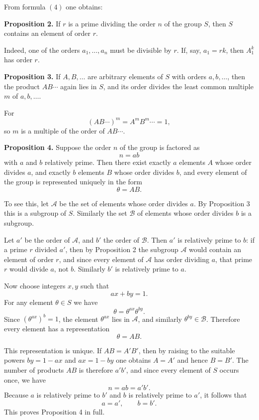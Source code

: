 \documentclass[11pt,a4paper]{book}
\begin{document}
From formula \((4)\) one obtains:

\medskip
\noindent\textbf{Proposition 2.}
If \(r\) is a prime dividing the order \(n\) of the group \(S\), then \(S\) contains an element of order \(r\).

\medskip
Indeed, one of the orders \(a_1,\dots,a_n\) must be divisible by \(r\). If, say, \(a_1=rk\), then \(A_1^k\) has order \(r\).

\medskip
\noindent\textbf{Proposition 3.}
If \(A,B,\dots\) are arbitrary elements of \(S\) with orders \(a,b,\dots\), then the product \(AB\cdots\) again lies in \(S\), and its order divides the least common multiple \(m\) of \(a,b,\dots\).

\medskip
For
\[
(AB\cdots)^m=A^mB^m\cdots=1,
\]
so \(m\) is a multiple of the order of \(AB\cdots\).

\medskip
\noindent\textbf{Proposition 4.}
Suppose the order \(n\) of the group is factored as
\[
n=ab
\]
with \(a\) and \(b\) relatively prime. Then there exist exactly \(a\) elements \(A\) whose order divides \(a\), and exactly \(b\) elements \(B\) whose order divides \(b\), and every element of the group is represented uniquely in the form
\[
\theta=AB.
\tag{5}
\]

To see this, let \(\mathcal A\) be the set of elements whose order divides \(a\). By Proposition 3 this is a subgroup of \(S\). Similarly the set \(\mathcal B\) of elements whose order divides \(b\) is a subgroup.

Let \(a'\) be the order of \(\mathcal A\), and \(b'\) the order of \(\mathcal B\). Then \(a'\) is relatively prime to \(b\): if a prime \(r\) divided \(a'\), then by Proposition 2 the subgroup \(\mathcal A\) would contain an element of order \(r\), and since every element of \(\mathcal A\) has order dividing \(a\), that prime \(r\) would divide \(a\), not \(b\). Similarly \(b'\) is relatively prime to \(a\).

Now choose integers \(x,y\) such that
\[
ax+by=1.
\tag{6}
\]
For any element \(\theta\in S\) we have
\[
\theta=\theta^{ax}\theta^{by}.
\tag{7}
\]
Since \((\theta^{ax})^b=1\), the element \(\theta^{ax}\) lies in \(\mathcal A\), and similarly \(\theta^{by}\in\mathcal B\). Therefore every element has a representation
\[
\theta=AB.
\tag{8}
\]

This representation is unique. If \(AB=A'B'\), then by raising to the suitable powers \(by=1-ax\) and \(ax=1-by\) one obtains \(A=A'\) and hence \(B=B'\). The number of products \(AB\) is therefore \(a'b'\), and since every element of \(S\) occurs once, we have
\[
n=ab=a'b'.
\]
Because \(a\) is relatively prime to \(b'\) and \(b\) is relatively prime to \(a'\), it follows that
\[
a=a',\qquad b=b'.
\]
This proves Proposition 4 in full.
\end{document}
